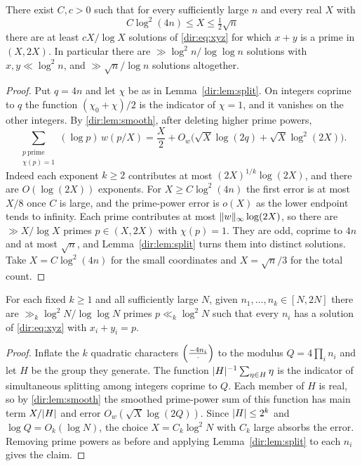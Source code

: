 \begin{theorem}
\label{dir:thm:xyz}
There exist $C,c>0$ such that for every sufficiently large $n$ and every real $X$ with
\[
 C\log^2(4n)\le X\le\tfrac12\sqrt n
\]
there are at least $cX/\log X$ solutions of \eqref{dir:eq:xyz} for which $x+y$ is a
prime in $(X,2X)$. In particular there are $\gg\log^2n/\log\log n$ solutions with
$x,y\ll\log^2n$, and $\gg\sqrt n/\log n$ solutions altogether.
\end{theorem}

\begin{proof}
Put $q=4n$ and let $\chi$ be as in Lemma~\ref{dir:lem:split}. On integers coprime to $q$ the
function $(\chi_0+\chi)/2$ is the indicator of $\chi=1$, and it vanishes on the other
integers. By \cref{dir:lem:smooth}, after deleting higher prime powers,
\[
 \sum_{\substack{p\ \mathrm{prime}\\ \chi(p)=1}}(\log p)\,w(p/X)
 =\frac X2+O_w\bigl(\sqrt X\log(2q)+\sqrt X\log^2(2X)\bigr).
\]
Indeed each exponent $k\ge2$ contributes at most $(2X)^{1/k}\log(2X)$, and there are
$O(\log(2X))$ exponents. For $X\ge C\log^2(4n)$ the first error is at most $X/8$ once
$C$ is large, and the prime-power error is $o(X)$ as the lower endpoint tends to
infinity. Each prime contributes at most $\lVert w\rVert_\infty\log(2X)$, so there are
$\gg X/\log X$ primes $p\in(X,2X)$ with $\chi(p)=1$. They are odd, coprime to $4n$ and
at most $\sqrt n$, and Lemma~\ref{dir:lem:split} turns them into distinct solutions. Take
$X=C\log^2(4n)$ for the small coordinates and $X=\sqrt n/3$ for the total count.
\end{proof}

\begin{theorem}\label{dir:thm:xyzmany}
For each fixed $k\ge1$ and all sufficiently large $N$, given
$n_1,\dots,n_k\in[N,2N]$ there are $\gg_k\log^2N/\log\log N$ primes $p\ll_k\log^2N$
such that every $n_i$ has a solution of \eqref{dir:eq:xyz} with $x_i+y_i=p$.
\end{theorem}

\begin{proof}
Inflate the $k$ quadratic characters $\Bigl(\frac{-4n_i}{\cdot}\Bigr)$ to the modulus
$Q=4\prod_in_i$ and let $H$ be the group they generate. The function
$\lvert H\rvert^{-1}\sum_{\eta\in H}\eta$ is the indicator of simultaneous splitting among
integers coprime to $Q$. Each member of $H$ is real, so by \cref{dir:lem:smooth} the
smoothed prime-power sum of this function has main term $X/\lvert H\rvert$ and error
$O_w(\sqrt X\log(2Q))$. Since $\lvert H\rvert\le2^k$ and $\log Q=O_k(\log N)$, the choice
$X=C_k\log^2N$ with $C_k$ large absorbs the error. Removing prime powers as before and
applying Lemma~\ref{dir:lem:split} to each $n_i$ gives the claim.
\end{proof}

